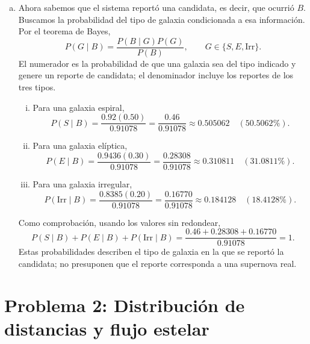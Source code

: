 \documentclass[a4paper]{article}
\begin{document}
\begin{enumerate}[a)]
Como los tipos son mutuamente excluyentes y abarcan toda la muestra, aplicamos nuevamente la ley de probabilidad total, ahora sobre el tipo de galaxia:
\begin{align*}
P(B)
&=P(B\mid S)P(S)+P(B\mid E)P(E)
  +P(B\mid\mathrm{Irr})P(\mathrm{Irr})\\
&=0.92(0.50)+0.9436(0.30)+0.8385(0.20)\\
&=0.46+0.28308+0.16770\\
&=\boxed{0.91078=91.078\%}.
\end{align*}
Esta es la probabilidad de que el sistema reporte una candidata en una galaxia elegida al azar de toda la muestra. No es la probabilidad de que esa galaxia tenga realmente una supernova. El valor elevado es consistente con los datos: incluso entre las galaxias sin supernova, el sistema reporta ``hay'' con probabilidades de $96\%$, $97\%$ y $94\%$, según el tipo.

\item Ahora sabemos que el sistema reportó una candidata, es decir, que ocurrió $B$. Buscamos la probabilidad del tipo de galaxia condicionada a esa información. Por el teorema de Bayes,
$$
P(G\mid B)=\frac{P(B\mid G)P(G)}{P(B)},
\qquad G\in\{S,E,\mathrm{Irr}\}.
$$
El numerador es la probabilidad de que una galaxia sea del tipo indicado y genere un reporte de candidata; el denominador incluye los reportes de los tres tipos.

\begin{enumerate}[i.]
\item Para una galaxia espiral,
$$
P(S\mid B)=\frac{0.92(0.50)}{0.91078}
=\frac{0.46}{0.91078}
\approx\boxed{0.505062\quad(50.5062\%)}.
$$
\item Para una galaxia elíptica,
$$
P(E\mid B)=\frac{0.9436(0.30)}{0.91078}
=\frac{0.28308}{0.91078}
\approx\boxed{0.310811\quad(31.0811\%)}.
$$
\item Para una galaxia irregular,
$$
P(\mathrm{Irr}\mid B)=\frac{0.8385(0.20)}{0.91078}
=\frac{0.16770}{0.91078}
\approx\boxed{0.184128\quad(18.4128\%)}.
$$
\end{enumerate}

Como comprobación, usando los valores sin redondear,
$$
P(S\mid B)+P(E\mid B)+P(\mathrm{Irr}\mid B)
=\frac{0.46+0.28308+0.16770}{0.91078}=1.
$$
Estas probabilidades describen el tipo de galaxia en la que se reportó la candidata; no presuponen que el reporte corresponda a una supernova real.
\end{enumerate}

\section{Problema 2: Distribución de distancias y flujo estelar}
\end{document}
